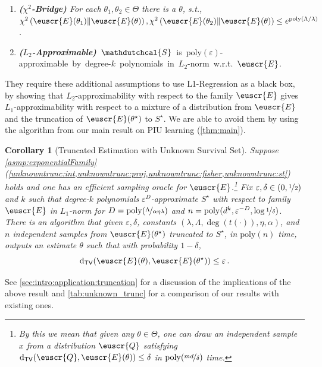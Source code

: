 \documentclass[11pt]{article}
\theoremstyle{plain}
\newtheorem{corollary}[theorem]{Corollary}
\theoremstyle{definition}
\theoremstyle{remark}
\newcommand{\sinparen}[1]{(#1)}
\newcommand{\inparen}[1]{\left(#1\right)}
\newcommand{\tv}[2]{\operatorname{d}_{\mathsf{TV}}\sinparen{#1,#2}}
\newcommand{\chidiv}[2]{\chi^2\inparen{#1\|#2}}
\newcommand{\sfrac}[2]{{#1/#2}}
\newcommand{\nfrac}[2]{\nicefrac{#1}{#2}}
\newcommand{\poly}{\mathrm{poly}}
\newcommand{\eps}{\varepsilon}
\newcommand{\customcal}[1]{\euscr{#1}}
\newcommand{\cE}{\customcal{E}}
\newcommand{\cQ}{\customcal{Q}}
\newcommand{\hypo}[1]{\mathdutchcal{#1}}
\newcommand{\hyS}{\hypo{S}}
\newcommand{\lreg}{\textsf{L1-Regression}}
\newcommand{\nL}{L}
\begin{document}
    \begin{enumerate}[start=5]
            \item \textit{\textbf{($\chi^2$-Bridge)} For each $\theta_1,\theta_2\in \Theta$ there is a $\theta$, s.t., $\chidiv{\cE(\theta_1)}{\cE(\theta)}, 
            \chidiv{\cE(\theta_2)}{\cE(\theta)}
            \leq  
            e^{\poly\inparen{\sfrac{\Lambda}{\lambda}}}$.}
            \label{unknowntrunc:chisquarebridge}
            \item \mbox{\textit{\textbf{($\nL_2$-Approximable)}} $\hyS$ is $\poly(\eps)$-approximable by degree-$k$ polynomials in $\nL_2$-norm w.r.t. $\cE$.}
    \end{enumerate}
    They require these additional assumptions to use \lreg{} as a black box, by showing that $\nL_2$-approximability with respect to the family $\cE$ gives $\nL_1$-approximability with respect to a mixture of a distribution from $\cE$ and the truncation of $\cE(\theta^\star)$ to $S^\star$. 
    We are able to avoid them by using the algorithm from our main result on PIU learning (\cref{thm:main}).
    
    \begin{corollary}[Truncated Estimation with Unknown Survival Set]\label{cor:truncation}
        Suppose \cref{asmp:exponentialFamily} (\cref{unknowntrunc:int,unknowntrunc:proj,unknowntrunc:fisher,unknowntrunc:st}) holds
        and  one has an efficient sampling oracle for $\cE$.\footnote{By this we mean that given any $\theta \in \Theta$, one can draw an independent sample $x$ from a distribution $\cQ$ satisfying $\tv{\cQ}{\cE(\theta)}\leq \delta$ in $\poly(\nfrac{md}{\delta})$ time.} Fix $\eps, \delta \in (0, \nfrac{1}{2})$ and $k$ such that degree-$k$ polynomials $\eps^{D}$-approximate $S^\star$ with respect to family $\cE$ in $\nL_1$-norm for $D=\poly(\nfrac{\Lambda}{\alpha \eta \lambda})$
        and $n = \poly(d^k, \eps^{-D}, \log \nfrac{1}{\delta})$. There is an algorithm that given $\eps, \delta$, constants $(\lambda,\Lambda,\deg(t(\cdot)),\eta,\alpha)$, and $n$ independent samples from $\cE(\theta^\star)$ truncated to $S^\star$, in $\poly(n)$ time, outputs an estimate $\theta$ such that with probability $1-\delta$,
        \[
            \tv{\cE(\theta)}{\cE(\theta^\star)} \leq \eps\,.
        \]
    \end{corollary}
    See \cref{sec:intro:application:truncation} for a discussion of the implications of the above result and \cref{tab:unknown_trunc} for a comparison of our results with existing ones.
    
\end{document}
